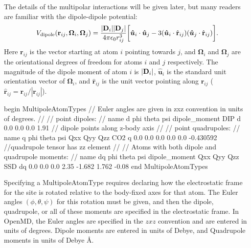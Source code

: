 \documentclass[]{book}
\begin{document}
The details of the multipolar interactions will be given later, but
many readers are familiar with the dipole-dipole potential:
\begin{equation}
V_{\text{dipole}}(\mathbf{r}_{ij},\boldsymbol{\Omega}_{i},
	\boldsymbol{\Omega}_{j}) = \frac{|{\bf D}_i||{\bf D}_j|}{4\pi\epsilon_{0}r_{ij}^{3}} \biggl[
	\boldsymbol{\hat{u}}_{i} \cdot \boldsymbol{\hat{u}}_{j}
	-
	3(\boldsymbol{\hat{u}}_i \cdot \hat{\mathbf{r}}_{ij}) %
		(\boldsymbol{\hat{u}}_j \cdot \hat{\mathbf{r}}_{ij}) \biggr].
\label{eq:dipolePot}
\end{equation}
Here $\mathbf{r}_{ij}$ is the vector starting at atom $i$ pointing
towards $j$, and $\boldsymbol{\Omega}_i$ and $\boldsymbol{\Omega}_j$
are the orientational degrees of freedom for atoms $i$ and $j$
respectively. The magnitude of the dipole moment of atom $i$ is $|{\bf
  D}_i|$, $\boldsymbol{\hat{u}}_i$ is the standard unit orientation
vector of $\boldsymbol{\Omega}_i$, and $\boldsymbol{\hat{r}}_{ij}$ is
the unit vector pointing along $\mathbf{r}_{ij}$
($\boldsymbol{\hat{r}}_{ij}=\mathbf{r}_{ij}/|\mathbf{r}_{ij}|$).


\begin{code}[caption={[An example of a MultipoleAtomTypes block.] A
simple example of a MultipoleAtomTypes block.   Dipoles are given in
units of Debyes, and Quadrupole moments are given in units of Debye
\AA~(or $10^{-26} \mathrm{~esu~cm}^2$)},
label={sch:MultipoleAtomTypesBlock}]
begin MultipoleAtomTypes
// Euler angles are given in zxz convention in units of degrees.
//
// point dipoles:
// name d phi theta psi dipole_moment
DIP     d 0.0 0.0   0.0     1.91   // dipole points along z-body axis
//
// point quadrupoles:
// name q phi theta psi Qxx Qyy Qzz
CO2     q 0.0 0.0   0.0 0.0 0.0 -0.430592  //quadrupole tensor has zz element
//
// Atoms with both dipole and quadrupole moments:
// name dq phi theta psi dipole_moment  Qxx    Qyy     Qzz
SSD     dq 0.0 0.0   0.0     2.35      -1.682  1.762   -0.08
end MultipoleAtomTypes
\end{code}

Specifying a MultipoleAtomType requires declaring how the
electrostatic frame for the site is rotated relative to the body-fixed
axes for that atom. The Euler angles $(\phi, \theta, \psi)$ for this
rotation must be given, and then the dipole, quadrupole, or all of
these moments are specified in the electrostatic frame.  In OpenMD,
the Euler angles are specified in the $zxz$ convention and are entered
in units of degrees.  Dipole moments are entered in units of Debye,
and Quadrupole moments in units of Debye \AA.
\end{document}
